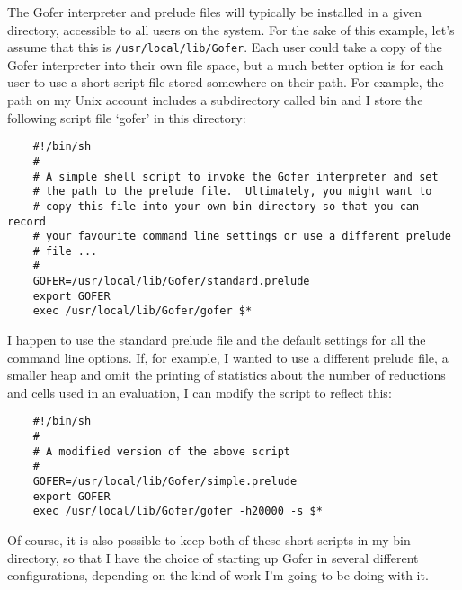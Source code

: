The Gofer interpreter and prelude files will typically be installed in
a given directory, accessible to all users on the system.  For the sake
of this example, let's assume that this is \verb"/usr/local/lib/Gofer".  Each
user could take a copy of the Gofer interpreter into their own file
space, but a much better option is for each user to use a short script
file stored somewhere on their path.  For example, the path on my Unix
account includes a subdirectory called bin and I store the following
script file `gofer' in this directory:
\begin{verbatim}
    #!/bin/sh
    #
    # A simple shell script to invoke the Gofer interpreter and set
    # the path to the prelude file.  Ultimately, you might want to
    # copy this file into your own bin directory so that you can record
    # your favourite command line settings or use a different prelude
    # file ...
    #
    GOFER=/usr/local/lib/Gofer/standard.prelude
    export GOFER
    exec /usr/local/lib/Gofer/gofer $*
\end{verbatim}
I happen to use the standard prelude file and the default settings for
all the command line options.  If, for example, I wanted to use a
different prelude file, a smaller heap and omit the printing of
statistics about the number of reductions and cells used in an
evaluation, I can modify the script to reflect this:
\begin{verbatim}
    #!/bin/sh
    #
    # A modified version of the above script
    #
    GOFER=/usr/local/lib/Gofer/simple.prelude
    export GOFER
    exec /usr/local/lib/Gofer/gofer -h20000 -s $*
\end{verbatim}
Of course, it is also possible to keep both of these short scripts in
my bin directory, so that I have the choice of starting up Gofer in
several different configurations, depending on the kind of work I'm
going to be doing with it.


